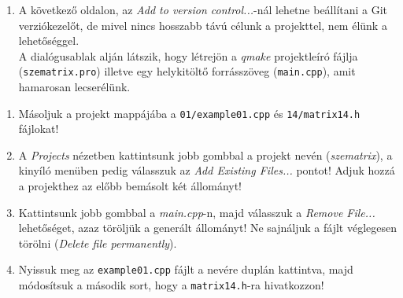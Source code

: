 \begin{frame}
  \begin{enumerate}
    \setcounter{enumi}{\theqt}
    \item A következő oldalon, az \emph{Add to version control...}-nál lehetne beállítani a Git verziókezelőt, de mivel nincs hosszabb távú célunk a projekttel, nem élünk a lehetőséggel.\\
    A dialógusablak alján látszik, hogy létrejön a \emph{qmake} projektleíró fájlja (\texttt{szematrix.pro}) illetve egy helykitöltő forrásszöveg (\texttt{main.cpp}), amit hamarosan lecserélünk.\\
    \setcounter{qt}{\theenumi}
  \end{enumerate}
\end{frame}

\begin{frame}
  \begin{enumerate}
    \setcounter{enumi}{\theqt}
    \item Másoljuk a projekt mappájába a \texttt{01/example01.cpp} és \texttt{14/matrix14.h} fájlokat!
    \item A \emph{Projects} nézetben kattintsunk jobb gombbal a projekt nevén (\emph{szematrix}), a kinyíló menüben pedig válasszuk az \emph{Add Existing Files...} pontot! Adjuk hozzá a projekthez az előbb bemásolt két állományt!
    \item Kattintsunk jobb gombbal a \emph{main.cpp}-n, majd válasszuk a \emph{Remove File...} lehetőséget, azaz töröljük a generált állományt! Ne sajnáljuk a fájlt véglegesen törölni (\emph{Delete file permanently}).
    \item Nyissuk meg az \texttt{example01.cpp} fájlt a nevére duplán kattintva, majd módosítsuk a második sort, hogy a \texttt{matrix14.h}-ra hivatkozzon!
    \setcounter{qt}{\theenumi}
  \end{enumerate}
\end{frame}

